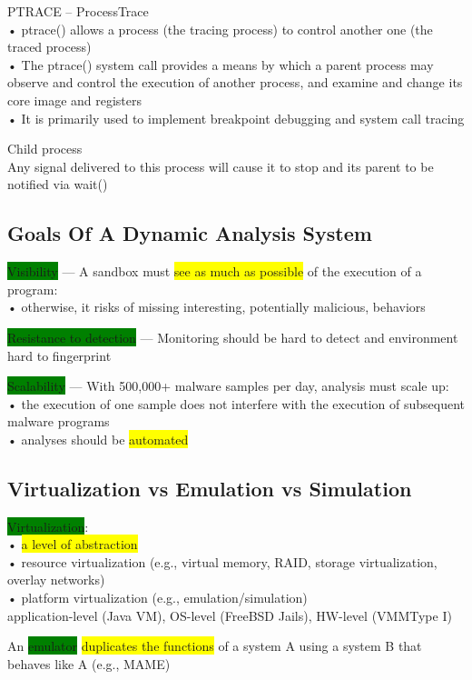 \documentclass[]{project_plan}
\begin{document}
PTRACE – ProcessTrace\\
• ptrace() allows a process (the tracing process) to control another one (the traced
process)\\
• The ptrace() system call provides a means by which a parent process may observe
and control the execution of another process, and examine and change its core image
and registers\\
• It is primarily used to implement breakpoint debugging and system call tracing

Child process\\
Any signal delivered to this process will cause it to stop and its parent to be
notified via wait()

\subsection{Goals Of A Dynamic Analysis System}

\colorbox{green}{Visibility} — A sandbox must \colorbox{yellow}{see as much as possible} of the execution of a
program:\\
• otherwise, it risks of missing interesting, potentially malicious, behaviors

\colorbox{green}{Resistance to detection} — Monitoring should be hard to detect and
environment hard to fingerprint

\colorbox{green}{Scalability} — With 500,000+ malware samples per day, analysis must scale up:\\
• the execution of one sample does not interfere with the execution of subsequent
malware programs\\
• analyses should be \colorbox{yellow}{automated}

\subsection{Virtualization vs Emulation vs Simulation}

\colorbox{green}{Virtualization}:\\
• \colorbox{yellow}{a level of abstraction}\\
• resource virtualization (e.g., virtual memory, RAID, storage virtualization, overlay
networks)\\
• platform virtualization (e.g., emulation/simulation)\\
application-level (Java VM), OS-level (FreeBSD Jails), HW-level (VMMType I)

An \colorbox{green}{emulator} \colorbox{yellow}{duplicates the functions} of a system A using a system B that
behaves like A (e.g., MAME)
\end{document}
